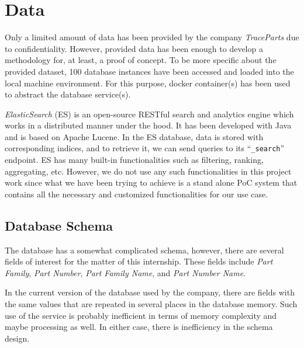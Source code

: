 \label{chap:development}
\section{Data}

Only a limited amount of data has been provided by the company \textit{TraceParts} due to 
confidentiality. 
However, provided data has been enough to develop a methodology for, at least, a proof of concept. 
To be more specific about the provided dataset, 100 database instances have been accessed and loaded 
into the local machine environment. For this purpose, docker container(s) has been used to abstract 
the database service(s).


\textit{ElasticSearch} (ES) is an open-source RESTful search and analytics engine which works in a 
distributed manner under the hood. It has been developed with Java and is based on Apache Lucene. 
In the ES database, data is stored with corresponding indices, and to retrieve it, we can send queries 
to its ``\lstinline{_search}'' endpoint. ES has many built-in functionalities such as filtering, 
ranking, aggregating, etc. However, we do not use any such functionalities in this project work since 
what we have been trying to achieve is a stand alone PoC system that contains all the necessary 
and customized functionalities for our use case.

\subsection{Database Schema}

The database has a somewhat complicated schema, however, there are several fields of interest for the 
matter of this internship. These fields include \textit{Part Family}, \textit{Part Number}, 
\textit{Part Family Name}, and \textit{Part Number Name}.

In the current version of the database used by the company, there are fields with the same values 
that are repeated in several places in the database memory. Such use of the service is probably 
inefficient in terms of memory complexity and maybe processing as well. In either case, there is 
inefficiency in the schema design.

